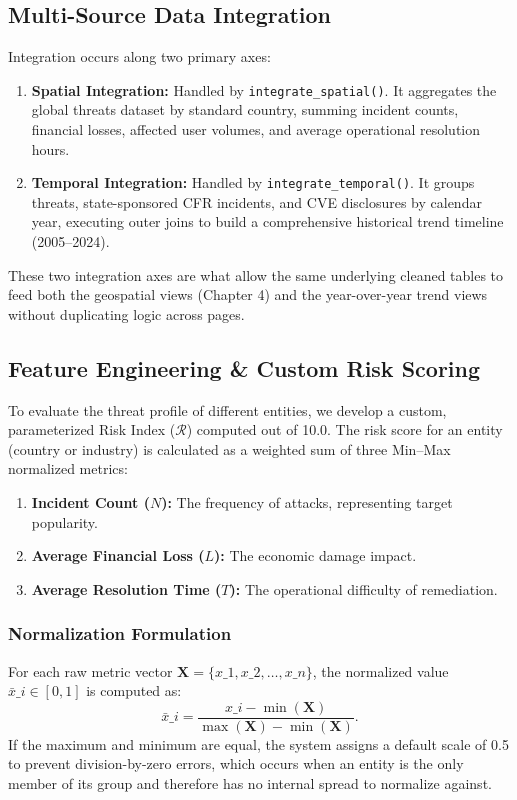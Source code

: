 \documentclass[a4paper, 12pt]{report}
\begin{document}
\subsection{Multi-Source Data Integration}
Integration occurs along two primary axes:
\begin{enumerate}
    \item \textbf{Spatial Integration:} Handled by \texttt{integrate\_spatial()}. It aggregates the global threats dataset by standard country, summing incident counts, financial losses, affected user volumes, and average operational resolution hours.
    \item \textbf{Temporal Integration:} Handled by \texttt{integrate\_temporal()}. It groups threats, state-sponsored CFR incidents, and CVE disclosures by calendar year, executing outer joins to build a comprehensive historical trend timeline (2005--2024).
\end{enumerate}
These two integration axes are what allow the same underlying cleaned tables to feed both the geospatial views (Chapter 4) and the year-over-year trend views without duplicating logic across pages.

\subsection{Feature Engineering \& Custom Risk Scoring}
To evaluate the threat profile of different entities, we develop a custom, parameterized Risk Index ($\mathcal{R}$) computed out of 10.0. The risk score for an entity (country or industry) is calculated as a weighted sum of three Min--Max normalized metrics:
\begin{enumerate}
    \item \textbf{Incident Count ($N$):} The frequency of attacks, representing target popularity.
    \item \textbf{Average Financial Loss ($L$):} The economic damage impact.
    \item \textbf{Average Resolution Time ($T$):} The operational difficulty of remediation.
\end{enumerate}

\subsubsection{Normalization Formulation}
For each raw metric vector $\mathbf{X} = \{x\_1, x\_2, \dots, x\_n\}$, the normalized value $\bar{x}\_i \in [0,1]$ is computed as:
\begin{equation}
\bar{x}\_i = \frac{x\_i - \min(\mathbf{X})}{\max(\mathbf{X}) - \min(\mathbf{X})}.
\end{equation}
If the maximum and minimum are equal, the system assigns a default scale of 0.5 to prevent division-by-zero errors, which occurs when an entity is the only member of its group and therefore has no internal spread to normalize against.
\end{document}
